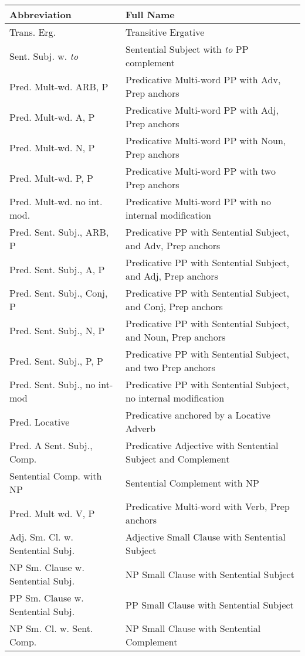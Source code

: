 \small
\begin{tabular}{ll}
Abbreviation&Full Name\\
\hline
Trans. Erg. & Transitive Ergative \\
Sent. Subj. w. {\it to} & Sentential Subject with {\it to} PP complement \\
Pred. Mult-wd. ARB, P & Predicative Multi-word PP with Adv, Prep anchors\\
Pred. Mult-wd. A, P & Predicative Multi-word PP with Adj, Prep anchors\\
Pred. Mult-wd. N, P & Predicative Multi-word PP with Noun, Prep
anchors\\
Pred. Mult-wd. P, P & Predicative Multi-word PP with two Prep
anchors\\
Pred. Mult-wd. no int. mod. & Predicative Multi-word PP with no internal
modification\\
Pred. Sent. Subj., ARB, P & Predicative PP with Sentential Subject, and
Adv, Prep anchors\\
Pred. Sent. Subj., A, P & Predicative PP with Sentential Subject, and
Adj, Prep anchors\\
Pred. Sent. Subj., Conj, P & Predicative PP with Sentential Subject, and
Conj, Prep anchors\\
Pred. Sent. Subj., N, P & Predicative PP with Sentential Subject, and
Noun, Prep anchors\\
Pred. Sent. Subj., P, P & Predicative PP with Sentential Subject, and two
Prep anchors\\
Pred. Sent. Subj., no int-mod & Predicative PP with Sentential Subject,
no internal modification\\
Pred. Locative & Predicative anchored by a Locative Adverb\\
Pred. A Sent. Subj., Comp. & Predicative Adjective with Sentential
Subject and Complement\\
Sentential Comp. with NP&Sentential Complement with NP\\
Pred. Mult wd. V, P & Predicative Multi-word with Verb, Prep anchors \\
Adj. Sm. Cl. w. Sentential Subj.&Adjective Small Clause with Sentential Subject\\
NP Sm. Clause w. Sentential Subj.&NP Small Clause with Sentential Subject\\
PP Sm. Clause w. Sentential Subj.&PP Small Clause with Sentential Subject\\
NP Sm. Cl. w. Sent. Comp.&NP Small Clause with Sentential Complement\\

\end{tabular}
